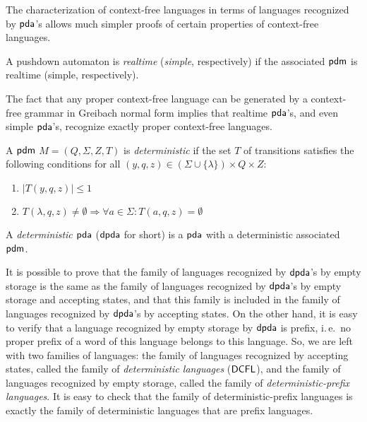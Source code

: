 The characterization of context-free languages in terms of languages recognized by \index{$\pda$}$\pda$'s allows much simpler proofs of certain properties of context-free languages.

A pushdown automaton is \emph{realtime} (\emph{simple}, respectively) if the associated \index{$\pdm$}$\pdm$ is realtime (simple, respectively).

The fact that any proper context-free language can be generated by a context-free grammar in Greibach normal form implies that realtime \index{$\pda$}$\pda$'s, and even simple \index{$\pda$}$\pda$'s, recognize exactly proper context-free languages.

A \index{$\pdm$}$\pdm$ $M = (Q, \Sigma, Z, T)$ is \emph{deterministic} if the set $T$ of transitions satisfies the following conditions for all $(y, q, z) \in (\Sigma \cup \{\lambda\}) \times Q \times Z$:

\begin{enumerate}
\item $|T(y, q, z)| \le 1$
\item $T(\lambda, q, z) \neq \emptyset \Rightarrow \forall a \in \Sigma: T(a, q, z) = \emptyset$
\end{enumerate}

A \emph{deterministic $\pda$} \index{$\dpda$}($\dpda$ for short) is a $\pda$ with a deterministic associated \index{$\pdm$}$\pdm$.

It is possible to prove that the family of languages recognized by $\dpda$'s by empty storage is the same as the family of languages recognized by $\dpda$'s by empty storage and accepting states, and that this family is included in the family of languages recognized by $\dpda$'s by accepting states. On the other hand, it is easy to verify that a language recognized by empty storage by $\dpda$ is prefix, i.\,e.\ no proper prefix of a word of this language belongs to this language. So, we are left with two families of languages: the family of languages recognized by accepting states, called the family of \emph{deterministic languages} \index{$\DCFL$}($\DCFL$), and the family of languages recognized by empty storage, called the family of  \emph{deterministic-prefix languages}. It is easy to check that the family of deterministic-prefix languages is exactly the family of deterministic languages that are prefix languages.

